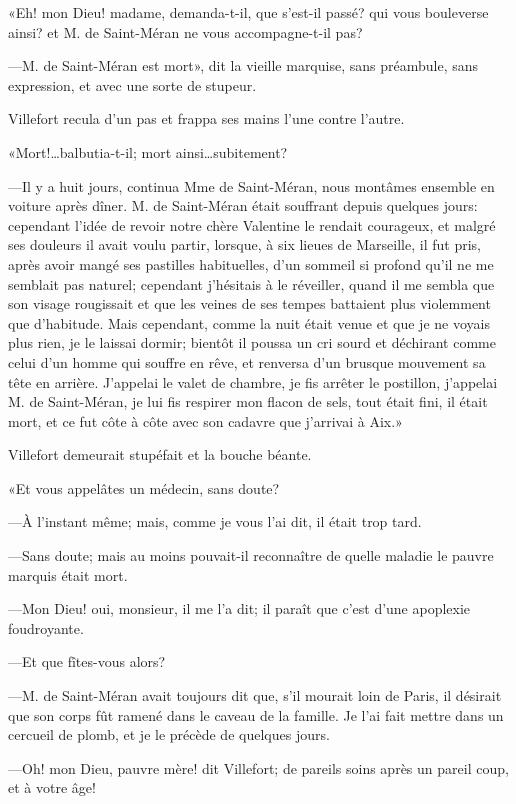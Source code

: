 «Eh! mon Dieu! madame, demanda-t-il, que s'est-il passé? qui vous bouleverse ainsi? et M. de Saint-Méran ne vous accompagne-t-il pas? 

—M. de Saint-Méran est mort», dit la vieille marquise, sans préambule, sans expression, et avec une sorte de stupeur. 

Villefort recula d'un pas et frappa ses mains l'une contre l'autre. 

«Mort!\dots balbutia-t-il; mort ainsi\dots subitement? 

—Il y a huit jours, continua Mme de Saint-Méran, nous montâmes ensemble en voiture après dîner. M. de Saint-Méran était souffrant depuis quelques jours: cependant l'idée de revoir notre chère Valentine le rendait courageux, et malgré ses douleurs il avait voulu partir, lorsque, à six lieues de Marseille, il fut pris, après avoir mangé ses pastilles habituelles, d'un sommeil si profond qu'il ne me semblait pas naturel; cependant j'hésitais à le réveiller, quand il me sembla que son visage rougissait et que les veines de ses tempes battaient plus violemment que d'habitude. Mais cependant, comme la nuit était venue et que je ne voyais plus rien, je le laissai dormir; bientôt il poussa un cri sourd et déchirant comme celui d'un homme qui souffre en rêve, et renversa d'un brusque mouvement sa tête en arrière. J'appelai le valet de chambre, je fis arrêter le postillon, j'appelai M. de Saint-Méran, je lui fis respirer mon flacon de sels, tout était fini, il était mort, et ce fut côte à côte avec son cadavre que j'arrivai à Aix.» 

Villefort demeurait stupéfait et la bouche béante. 

«Et vous appelâtes un médecin, sans doute? 

—À l'instant même; mais, comme je vous l'ai dit, il était trop tard. 

—Sans doute; mais au moins pouvait-il reconnaître de quelle maladie le pauvre marquis était mort. 

—Mon Dieu! oui, monsieur, il me l'a dit; il paraît que c'est d'une apoplexie foudroyante.  

—Et que fîtes-vous alors? 

—M. de Saint-Méran avait toujours dit que, s'il mourait loin de Paris, il désirait que son corps fût ramené dans le caveau de la famille. Je l'ai fait mettre dans un cercueil de plomb, et je le précède de quelques jours. 

—Oh! mon Dieu, pauvre mère! dit Villefort; de pareils soins après un pareil coup, et à votre âge! 

